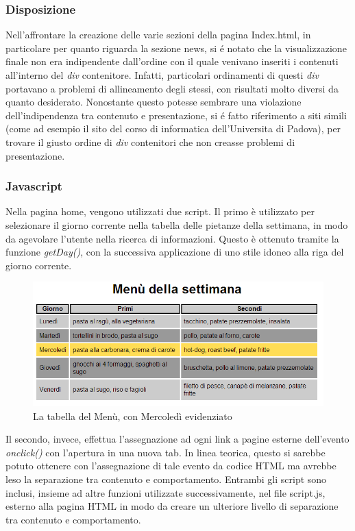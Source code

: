 \documentclass[10pt,a4paper,onecolumn]{article}
\begin{document}
\subsubsection{Disposizione}

Nell'affrontare la creazione delle varie sezioni della pagina Index.html, in particolare per quanto riguarda la sezione news, si é notato che la visualizzazione finale non era indipendente dall'ordine con il quale venivano inseriti i contenuti all'interno del \textit{div} contenitore. 
Infatti, particolari ordinamenti di questi \textit{div} portavano a problemi di allineamento degli stessi, con risultati molto diversi da quanto desiderato. Nonostante questo potesse sembrare una violazione dell'indipendenza tra contenuto e presentazione, si é fatto riferimento a siti simili (come ad esempio il sito del corso di informatica dell'Universita di Padova), per trovare il giusto ordine di \textit{div} contenitori che non creasse problemi di presentazione.

\subsubsection{Javascript}

Nella pagina home, vengono utilizzati due script. Il primo è utilizzato per selezionare il giorno corrente nella tabella delle pietanze della settimana, in modo da agevolare l'utente nella ricerca di informazioni. Questo è ottenuto tramite la funzione \textit{getDay()}, con la successiva applicazione di uno stile idoneo alla riga del giorno corrente.
\begin{figure}[h]
\centering
\includegraphics[scale=0.45]{tabellaMenu}
\caption{La tabella del Menù, con Mercoledì evidenziato}
\label{tabellaMenu}
\end{figure}
Il secondo, invece, effettua l'assegnazione ad ogni link a pagine esterne dell'evento \textit{onclick()} con l'apertura in una nuova tab. In linea teorica, questo si sarebbe potuto ottenere con l'assegnazione di tale evento da codice HTML ma avrebbe leso la separazione tra contenuto e comportamento. 
Entrambi gli script sono inclusi, insieme ad altre funzioni utilizzate successivamente, nel file script.js, esterno alla pagina HTML in modo da creare un ulteriore livello di separazione tra contenuto e comportamento.
\end{document}
